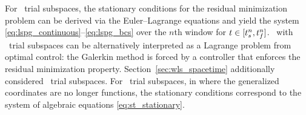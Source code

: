 For \spatialAcronym\ trial subspaces, the stationary conditions for the
residual minimization problem can be derived via the Euler--Lagrange equations
and yield the system \eqref{eq:lspg_continuous}--\eqref{eq:lspg_bcs} over the $n$th window for $t \in
[t_s^{n},t_f^{n}]$.
\methodAcronym\ with \spatialAcronym\ trial subspaces can be alternatively interpreted as a Lagrange problem from optimal control: the Galerkin method is forced by a 
controller that enforces the residual minimization property. 
Section~\ref{sec:wls_spacetime} additionally considered \spaceTimeAcronym\
trial subspaces. For \spaceTimeAcronym\ trial subspaces, in where the
generalized coordinates are no longer functions, the stationary conditions
correspond to the system of algebraic equations \eqref{eq:st_stationary}.
